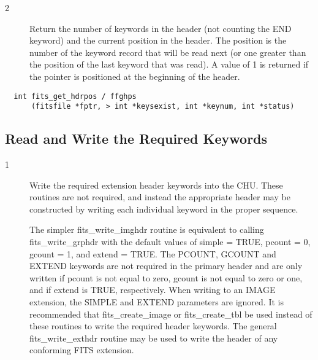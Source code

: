 \documentclass[11pt]{book}
\begin{document}
\begin{description}
\item[2 ] Return the number of keywords in the header (not counting the END
    keyword) and the current position
    in the header.  The position is the number of the keyword record that
    will be read next (or one greater than the position of the last keyword
    that was read). A value of 1 is returned if the pointer is
   positioned at the beginning of the header. \label{ffghps}
\end{description}

\begin{verbatim}
  int fits_get_hdrpos / ffghps
      (fitsfile *fptr, > int *keysexist, int *keynum, int *status)
\end{verbatim}


\subsection{Read and Write the Required Keywords}


\begin{description}
\item[1 ] Write the required extension header keywords into the CHU.
  These routines are not required, and instead the appropriate
  header may be constructed by writing each individual keyword in the
  proper sequence.

  The simpler fits\_write\_imghdr routine is equivalent to calling
  fits\_write\_grphdr with the default values of simple = TRUE, pcount
  = 0, gcount = 1, and extend = TRUE.  The PCOUNT, GCOUNT and EXTEND
  keywords are not required in the primary header and are only written
  if pcount is not equal to zero, gcount is not equal to zero or one,
  and if extend is TRUE, respectively.  When writing to an IMAGE
  extension, the SIMPLE and EXTEND parameters are ignored.  It is
  recommended that fits\_create\_image or fits\_create\_tbl be used
  instead of these routines to write the
  required header keywords. The general fits\_write\_exthdr routine
  may be used to write the header of any conforming FITS
 extension.  \label{ffphpr} \label{ffphps}
\end{description}
\end{document}
